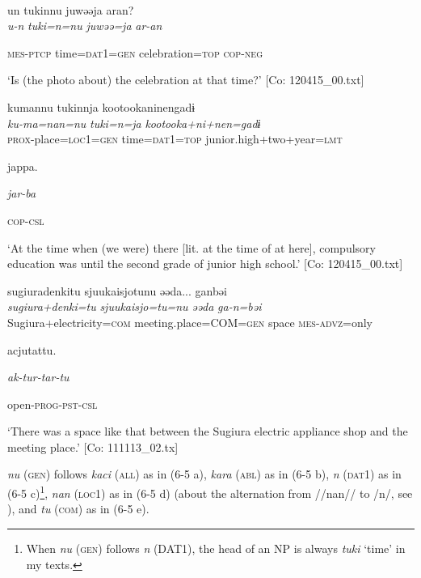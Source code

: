  \ex{}\\
{\TM}
\gll  un  tukinnu  juwəəja  aran?\\

      \textit{u-n}  \textit{tuki=n=nu}  \textit{juwəə=ja}  \textit{ar-an}

      \textsc{mes}-\textsc{ptcp}  time=\textsc{dat}1=\textsc{gen}  celebration=\textsc{top}  \textsc{cop}-\textsc{neg}

\glt ‘Is (the photo about) the celebration at that time?’ [Co: 120415\_00.txt]
\z

 \ex {\TM}  kumannu  tukinnja  {\textbar}kootookaninen{\textbar}gadɨ\\
\gll \textit{ku-ma=nan=nu}  \textit{tuki=n=ja}  \textit{kootooka+ni+nen=gadɨ}\\

      \textsc{prox}-place=\textsc{loc}1=\textsc{gen}  time=\textsc{dat}1=\textsc{top}  junior.high+two+year=\textsc{lmt}

      jappa.

      \textit{jar-ba}

      \textsc{cop}-\textsc{csl}

\glt ‘At the time when (we were) there [lit. at the time of at here], compulsory education was until the second grade of junior high school.’ [Co: 120415\_00.txt]
\z

 \ex {\TM}  {\textbar}sugiuradenki{\textbar}tu  {\textbar}sjuukaisjo{\textbar}tunu  əəda...  ganbəi\\
\gll \textit{sugiura+denki=tu}  \textit{sjuukaisjo=tu=nu}  \textit{əəda}  \textit{ga-n=bəi}\\

      Sugiura+electricity=\textsc{com}  meeting.place=COM=\textsc{gen}  space  \textsc{mes}-\textsc{advz}=only

      acjutattu.

      \textit{ak-tur-tar-tu}

      open-\textsc{prog}-\textsc{pst}-\textsc{csl}

\glt ‘There was a space like that between the Sugiura electric appliance shop and the meeting place.’ [Co: 111113\_02.tx]

\textit{nu} (\textsc{gen}) follows \textit{kaci} (\textsc{all}) as in (6-5 a), \textit{kara} (\textsc{abl}) as in (6-5 b), \textit{n} (\textsc{dat}1) as in (6-5 c)\footnote{When \textit{nu} (\textsc{gen}) follows \textit{n} (DAT1), the head of an NP is always \textit{tuki} ‘time’ in my texts.}, \textit{nan} (\textsc{loc}1) as in (6-5 d) (about the alternation from //nan// to /n/, see ), and \textit{tu} (\textsc{com}) as in (6-5 e).

